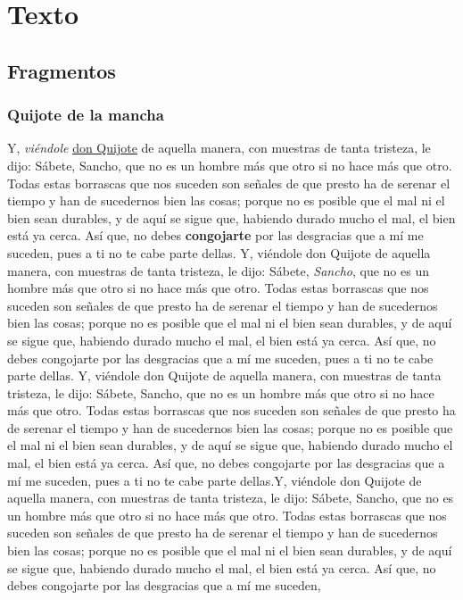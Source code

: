 \section{Texto}

\subsection{Fragmentos}

\subsubsection{Quijote de la mancha}

Y, \textit{viéndole} \underline{don Quijote} de aquella manera, con muestras de tanta tristeza, le dijo: Sábete, Sancho, que no es un hombre más que otro si no hace más que otro. Todas estas borrascas que nos suceden son señales de que presto ha de serenar el tiempo y han de sucedernos bien las cosas; porque no es posible que el mal ni el bien sean durables, y de aquí se sigue que, habiendo durado mucho el mal, el bien está ya cerca. Así que, no debes \textbf{congojarte} por las desgracias que a mí me suceden, pues a ti no te cabe parte dellas. Y, viéndole don Quijote de aquella manera, con muestras de tanta tristeza, le dijo: Sábete, \textit{Sancho}, que no es un hombre más que otro si no hace más que otro. Todas estas borrascas que nos suceden son señales de que presto ha de serenar el tiempo y han de sucedernos bien las cosas; porque no es posible que el mal ni el bien sean durables, y de aquí se sigue que, habiendo durado mucho el mal, el bien está ya cerca. Así que, no debes congojarte por las desgracias que a mí me suceden, pues a ti no te cabe parte dellas. Y, viéndole don Quijote de aquella manera, con muestras de tanta tristeza, le dijo: Sábete, Sancho, que no es un hombre más que otro si no hace más que otro. Todas estas borrascas que nos suceden son señales de que presto ha de serenar el tiempo y han de sucedernos bien las cosas; porque no es posible que el mal ni el bien sean durables, y de aquí se sigue que, habiendo durado mucho el mal, el bien está ya cerca. Así que, no debes congojarte por las desgracias que a mí me suceden, pues a ti no te cabe parte dellas.Y, viéndole don Quijote de aquella manera, con muestras de tanta tristeza, le dijo: Sábete, Sancho, que no es un hombre más que otro si no hace más que otro. Todas estas borrascas que nos suceden son señales de que presto ha de serenar el tiempo y han de sucedernos bien las cosas; porque no es posible que el mal ni el bien sean durables, y de aquí se sigue que, habiendo durado mucho el mal, el bien está ya cerca. Así que, no debes congojarte por las desgracias que a mí me suceden,


